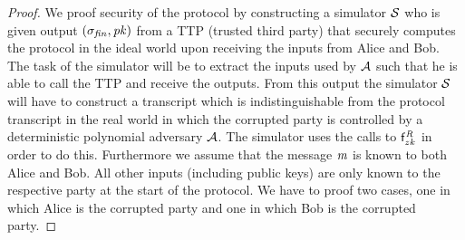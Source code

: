 \begin{proof}
    We proof security of the protocol by constructing a simulator $\mathcal{S}$ who is given output $(\sigma_{\mathit{fin}}, \mathit{pk})$ from a TTP (trusted third party) that securely computes the protocol in the ideal world upon receiving the inputs from Alice and Bob.
    The task of the simulator will be to extract the inputs used by $\mathcal{A}$ such that he is able to call the TTP and receive the outputs.
    From this output the simulator $\mathcal{S}$ will have to construct a transcript which is indistinguishable from the protocol transcript in the real world in which the corrupted party is controlled by a deterministic polynomial adversary $\mathcal{A}$.
    The simulator uses the calls to $\mathsf{f}^{\mathit{R}}_{zk}$ in order to do this.
    Furthermore we assume that the message $\mathit{m}$ is known to both Alice and Bob.
    All other inputs (including public keys) are only known to the respective party at the start of the protocol.
    We have to proof two cases, one in which Alice is the corrupted party and one in which Bob is the corrupted party.
    

\end{proof}
